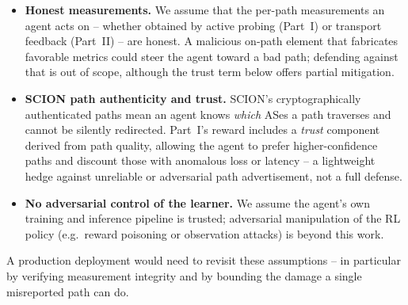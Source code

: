 \begin{itemize}
  \item \textbf{Honest measurements.} We assume that the per-path measurements an agent acts on --
  whether obtained by active probing (Part~I) or transport feedback (Part~II) -- are honest. A malicious
  on-path element that fabricates favorable metrics could steer the agent toward a bad path; defending
  against that is out of scope, although the trust term below offers partial mitigation.
  \item \textbf{SCION path authenticity and trust.} SCION's cryptographically authenticated paths mean
  an agent knows \emph{which} ASes a path traverses and cannot be silently redirected. Part~I's reward
  includes a \emph{trust} component derived from path quality, allowing the agent to prefer
  higher-confidence paths and discount those with anomalous loss or latency -- a lightweight hedge against
  unreliable or adversarial path advertisement, not a full defense.
  \item \textbf{No adversarial control of the learner.} We assume the agent's own training and
  inference pipeline is trusted; adversarial manipulation of the RL policy (e.g.\ reward poisoning or
  observation attacks) is beyond this work.
\end{itemize}

A production deployment would need to revisit these assumptions -- in particular by verifying measurement
integrity and by bounding the damage a single misreported path can do.
